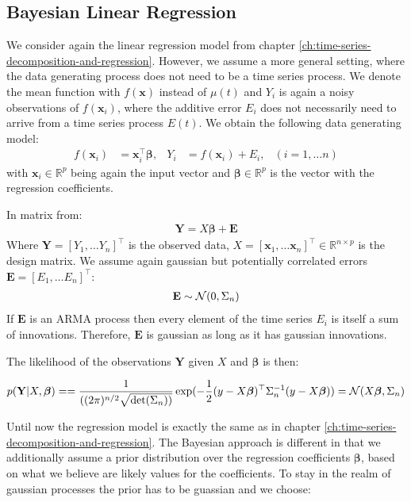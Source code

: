 \subsection{Bayesian Linear Regression}\label{subsec:bayesian-linear-regression}
We consider again the linear regression model from chapter \ref{ch:time-series-decomposition-and-regression}.
However, we assume a more general setting, where the data generating process does not need to be a time series process.
We denote the mean function with $f(\mathbf{x})$ instead of $\mu(t)$ and $Y_i$ is again a noisy observations of
$f(\mathbf{x}_i)$, where the additive error $E_i$ does not necessarily need to arrive from a time series process $E(t)$.
We obtain the following data generating model:
\begin{align*}
    f(\mathbf{x}_i) &= \mathbf{x}_i^{\top}\boldsymbol{\beta}, & Y_i &= f(\mathbf{x}_i) + E_i,  & (i = 1, \dots n)
\end{align*}
with $\mathbf{x}_i \in \mathbb{R}^p$ being again the input vector and $\boldsymbol{\beta} \in \mathbb{R}^p$ is the vector with
the regression coefficients.

In matrix from:
\begin{align*}
    \mathbf{Y} = X \boldsymbol{\beta} + \mathbf{E}
\end{align*}
Where $\mathbf{Y} = [Y_{1}, \dots Y_{n}]^{\top}$ is the observed data,
$X = [\mathbf{x}_{1}, \dots \mathbf{x}_{n}]^{\top} \in \mathbb{R}^{n \times p}$ is the design matrix.
We assume again gaussian but potentially correlated errors $\mathbf{E} = [E_{1}, \dots E_{n}]^{\top}$:
\begin{gather*}
    \mathbf{E} \sim \operatorname{\mathcal{N}}(0, \Sigma_n)
\end{gather*}
If $\mathbf{E}$ is an ARMA process then every element of the time series $E_{i}$
is itself a sum of innovations. Therefore, $\mathbf{E}$ is gaussian as long as it has
gaussian innovations.

The likelihood of the observations $\mathbf{Y}$ given $X$ and $\boldsymbol{\beta}$ is then:

\begin{gather*}
    p(\mathbf{Y}|X,\boldsymbol{\beta}) =
    = \frac{1}{( (2\pi)^{n/2} \sqrt {\det(\Sigma_n))}}
    \exp(-\frac{1}{2}(y - X\boldsymbol{\beta})^{\top} \Sigma_n^{-1}(y-X\boldsymbol{\beta}))
    = \operatorname{\mathcal{N}}(X \boldsymbol{\beta}, \Sigma_n)
\end{gather*}

Until now the regression model is exactly the same as in chapter \ref{ch:time-series-decomposition-and-regression}.
The Bayesian approach is different in that we additionally assume a prior distribution over the
regression coefficients $\boldsymbol{\beta}$, based on what we believe are likely values for the coefficients.
To stay in the realm of gaussian processes the prior has to be guassian and we choose:

